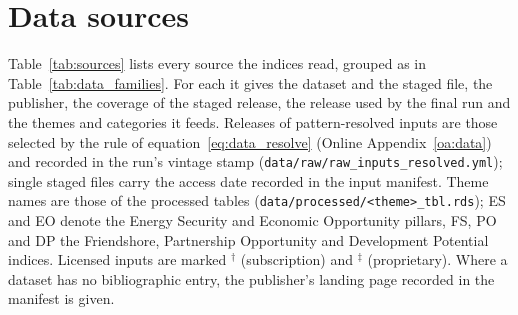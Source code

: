 
\section{Data sources}\label{app:sources}

Table~\ref{tab:sources} lists every source the indices read, grouped as in
Table~\ref{tab:data_families}. For each it gives the dataset and the staged file, the publisher,
the coverage of the staged release, the release used by the final run and the themes and
categories it feeds. Releases of pattern-resolved inputs are those selected by the rule of
equation~\eqref{eq:data_resolve} (Online Appendix~\ref{oa:data}) and recorded in the run's vintage
stamp (\texttt{data/raw/raw\_inputs\_resolved.yml}); single staged files carry the access date
recorded in the input manifest. Theme names are those of the processed tables
(\texttt{data/processed/<theme>\_tbl.rds}); ES and EO denote the Energy Security and Economic
Opportunity pillars, FS, PO and DP the Friendshore, Partnership Opportunity and Development
Potential indices. Licensed inputs are marked $^{\dagger}$ (subscription) and $^{\ddagger}$
(proprietary). Where a dataset has no bibliographic entry, the publisher's landing page recorded in
the manifest is given.

